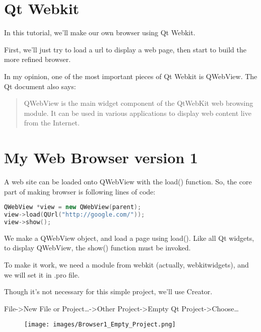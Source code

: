 

\minitoc

\section{Qt Webkit}\label{qt-webkit}

In this tutorial, we'll make our own browser using Qt Webkit.

First, we'll just try to load a url to display a web page, then start to
build the more refined browser.

In my opinion, one of the most important pieces of Qt Webkit is
QWebView. The Qt document also says:

\begin{quote}
QWebView is the main widget component of the QtWebKit web browsing
module. It can be used in various applications to display web content
live from the Internet.
\end{quote}

\section{My Web Browser version 1}\label{my-web-browser-version-1}

A web site can be loaded onto QWebView with the load() function. So, the
core part of making browser is following lines of code:

\begin{lstlisting}[language=c++, numbers=none]
QWebView *view = new QWebView(parent);
view->load(QUrl("http://google.com/"));
view->show();
\end{lstlisting}

We make a QWebView object, and load a page using load(). Like all Qt
widgets, to display QWebView, the show() function must be invoked.

To make it work, we need a module from webkit (actually, webkitwidgets),
and we will set it in .pro file.

Though it's not necessary for this simple project, we'll use Creator.

File-\textgreater{}New File or Project\ldots{}-\textgreater{}Other
Project-\textgreater{}Empty Qt Project-\textgreater{}Choose\ldots{}

\begin{figure}[htbp]
\centering
\texttt{[image: images/Browser1\_Empty\_Project.png]}
\caption{}
\end{figure}

